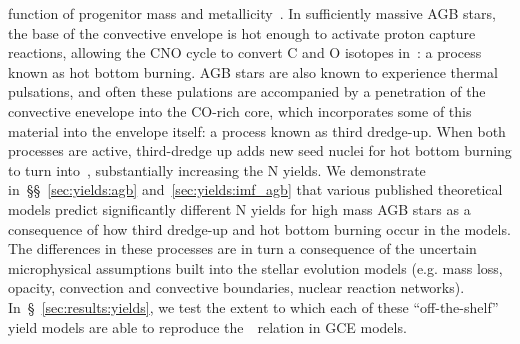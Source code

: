 \documentclass[ms.tex]{subfiles}
\begin{document}
function of progenitor mass and metallicity~\citep{Cristallo2011, Cristallo2015,
Karakas2010, Karakas2016, Karakas2018, Ventura2013, Ventura2014, Ventura2018,
Ventura2020}.
In sufficiently massive AGB stars, the base of the convective envelope is hot
enough to activate proton capture reactions, allowing the CNO cycle to convert
C and O isotopes in~\Nfourteen: a process known as hot bottom burning.
AGB stars are also known to experience thermal pulsations, and often these
pulations are accompanied by a penetration of the convective enevelope into the
CO-rich core, which incorporates some of this material into the envelope
itself: a process known as third dredge-up.
When both processes are active, third-dredge up adds new seed nuclei for hot
bottom burning to turn into~\Nfourteen, substantially increasing the N yields.
We demonstrate in~\S\S~\ref{sec:yields:agb} and~\ref{sec:yields:imf_agb} that
various published theoretical models predict significantly different N yields
for high mass AGB stars as a consequence of how third dredge-up and hot bottom
burning occur in the models.
The differences in these processes are in turn a consequence of the uncertain
microphysical assumptions built into the stellar evolution models (e.g. mass
loss, opacity, convection and convective boundaries, nuclear reaction
networks).
In~\S~\ref{sec:results:yields}, we test the extent to which each of these
``off-the-shelf'' yield models are able to reproduce the~\ohno~relation in
GCE models.
\par
\end{document}
